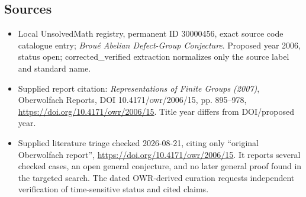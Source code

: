 \documentclass[11pt]{article}
\begin{document}
\subsection{Sources}
\begin{itemize}
\item Local UnsolvedMath registry, permanent ID 30000456, exact source code catalogue entry; \emph{Brou\'e Abelian Defect-Group Conjecture}. Proposed year 2006, status open; corrected\_verified extraction normalizes only the source label and standard name.
\item Supplied report citation: \emph{Representations of Finite Groups (2007)}, Oberwolfach Reports, DOI 10.4171/owr/2006/15, pp. 895--978, \url{https://doi.org/10.4171/owr/2006/15}. Title year differs from DOI/proposed year.
\item Supplied literature triage checked 2026-08-21, citing only ``original Oberwolfach report'', \url{https://doi.org/10.4171/owr/2006/15}. It reports several checked cases, an open general conjecture, and no later general proof found in the targeted search. The dated OWR-derived curation requests independent verification of time-sensitive status and cited claims.
\end{itemize}
\end{document}
